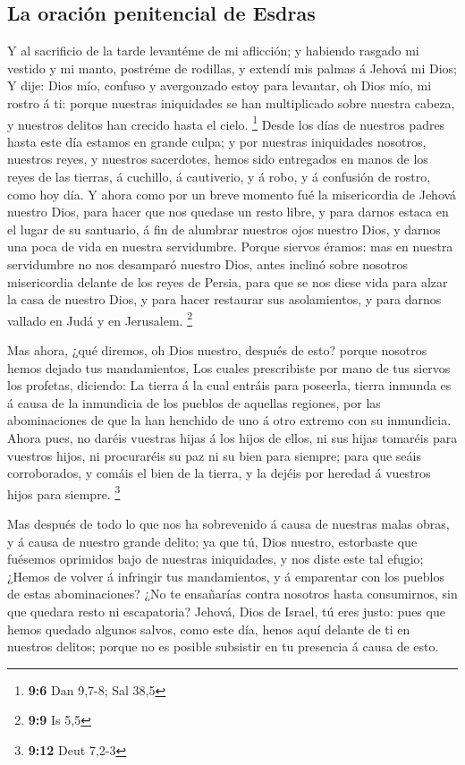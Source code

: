 \hypertarget{la-oraciuxf3n-penitencial-de-esdras}{%
\subsection{La oración penitencial de
Esdras}\label{la-oraciuxf3n-penitencial-de-esdras}}

 Y al sacrificio de la tarde levantéme de mi aflicción; y
habiendo rasgado mi vestido y mi manto, postréme de rodillas, y extendí
mis palmas á Jehová mi Dios;  Y dije: Dios mío, confuso y
avergonzado estoy para levantar, oh Dios mío, mi rostro á ti: porque
nuestras iniquidades se han multiplicado sobre nuestra cabeza, y
nuestros delitos han crecido hasta el cielo. \footnote{\textbf{9:6} Dan
  9,7-8; Sal 38,5}  Desde los días de nuestros padres
hasta este día estamos en grande culpa; y por nuestras iniquidades
nosotros, nuestros reyes, y nuestros sacerdotes, hemos sido entregados
en manos de los reyes de las tierras, á cuchillo, á cautiverio, y á
robo, y á confusión de rostro, como hoy día.  Y ahora como
por un breve momento fué la misericordia de Jehová nuestro Dios, para
hacer que nos quedase un resto libre, y para darnos estaca en el lugar
de su santuario, á fin de alumbrar nuestros ojos nuestro Dios, y darnos
una poca de vida en nuestra servidumbre.  Porque siervos
éramos: mas en nuestra servidumbre no nos desamparó nuestro Dios, antes
inclinó sobre nosotros misericordia delante de los reyes de Persia, para
que se nos diese vida para alzar la casa de nuestro Dios, y para hacer
restaurar sus asolamientos, y para darnos vallado en Judá y en
Jerusalem. \footnote{\textbf{9:9} Is 5,5}

 Mas ahora, ¿qué diremos, oh Dios nuestro, después de
esto? porque nosotros hemos dejado tus mandamientos,  Los
cuales prescribiste por mano de tus siervos los profetas, diciendo: La
tierra á la cual entráis para poseerla, tierra inmunda es á causa de la
inmundicia de los pueblos de aquellas regiones, por las abominaciones de
que la han henchido de uno á otro extremo con su inmundicia.
 Ahora pues, no daréis vuestras hijas á los hijos de
ellos, ni sus hijas tomaréis para vuestros hijos, ni procuraréis su paz
ni su bien para siempre; para que seáis corroborados, y comáis el bien
de la tierra, y la dejéis por heredad á vuestros hijos para siempre.
\footnote{\textbf{9:12} Deut 7,2-3}

 Mas después de todo lo que nos ha sobrevenido á causa de
nuestras malas obras, y á causa de nuestro grande delito; ya que tú,
Dios nuestro, estorbaste que fuésemos oprimidos bajo de nuestras
iniquidades, y nos diste este tal efugio;  ¿Hemos de
volver á infringir tus mandamientos, y á emparentar con los pueblos de
estas abominaciones? ¿No te ensañarías contra nosotros hasta
consumirnos, sin que quedara resto ni escapatoria? 
Jehová, Dios de Israel, tú eres justo: pues que hemos quedado algunos
salvos, como este día, henos aquí delante de ti en nuestros delitos;
porque no es posible subsistir en tu presencia á causa de esto.

